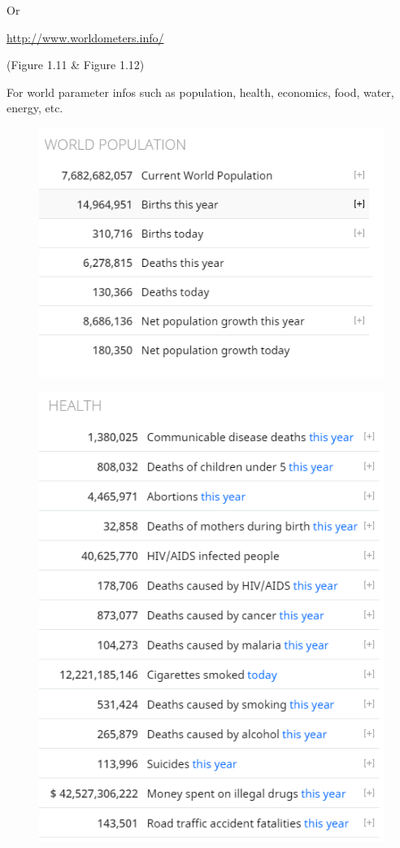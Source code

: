 \documentclass[]{book}
\begin{document}
Or

\url{http://www.worldometers.info/}

(Figure 1.11 \& Figure 1.12)

For world parameter infos such as population, health, economics, food,
water, energy, etc.

\begin{figure}
\centering
\includegraphics{11.PNG}
\caption{}
\end{figure}

\begin{figure}
\centering
\includegraphics{12.PNG}
\caption{}
\end{figure}
\end{document}

